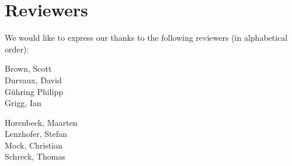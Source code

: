 \section{Reviewers}

We would like to express our thanks to the following reviewers (in alphabetical order):


\vline{}

\begin{minipage}[b]{0.5\linewidth}
\center
Brown, Scott \\
Durvaux, David \\
G\"uhring Philipp  \\
Grigg, Ian  \\
\end{minipage}
\begin{minipage}[b]{0.5\linewidth}
\center
Horenbeck, Maarten \\
Lenzhofer, Stefan \\
Mock, Christian  \\
Schreck, Thomas  \\
\end{minipage}



